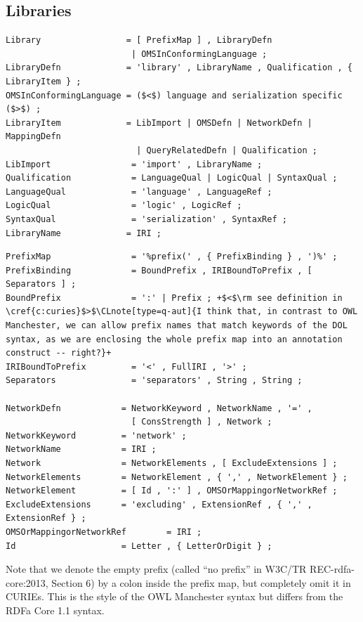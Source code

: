 \documentclass[10pt,fleqn,%
\ifpretendfinal
final%
\else
draft%
\fi,
]{scrreprt}
\makeatletter
\newcommand*\CommentAuthor{}
\renewcommand*\CommentAuthor{#1}}
\newcommand*\CommentDate{}
\renewcommand*\CommentDate{#1}}
\newcommand*\CommentId{}
\renewcommand*\CommentId{#1}}
\newcommand*\CommentType{}
\renewcommand*\CommentType{#1}}
\newcommand*{\SetCommentColorByType}[1]{%
\edef\localType{{#1}}%
\expandafter\ifstrequal\localType{q-aut}{\colorlet{CommentColor}{red}}{%
\expandafter\ifstrequal\localType{q-all}{\colorlet{CommentColor}{orange}}{%
\expandafter\ifstrequal\localType{todo}{\colorlet{CommentColor}{orange}}{%
\expandafter\ifstrequal\localType{fyi}{\colorlet{CommentColor}{lightgray}}{%
\colorlet{CommentColor}{yellow}}}}}}
\newcommand*{\SetCommentPrefixByType}[1]{%
\edef\localType{{#1}}%
\expandafter\@ifmtarg\localType{%
\edef\CommentPrefix{}%
}{%
\caseupper[q]{#1}%
\edef\CommentPrefix{\thestring: }%
}}
\newcommand*{\initComment}[1]{%
\setkeys{Comment}{#1}%
\SetCommentColorByType{\CommentType}%
\relax%
\SetCommentPrefixByType{\CommentType}%
\relax%
}
\newcommand*{\todonote}[2][]{%
\initComment{#1}%
\pdfcomment[author=\CommentAuthor,color=CommentColor,date=\CommentDate,id=\CommentId]{%
\CommentPrefix
#2}}
\renewcommand*{\todonote}[2][]{%
\initComment{#1}%
\ednote{\CommentPrefix #2}}
\newcommand*{\CLnote}[2][author=Christoph Lange]{%
\todonote[author=Christoph Lange,#1]{#2} 
}
\newcommand{\clauserefname}{clause}
\newcommand{\cref}[1]{\clauserefname~\ref{#1}}
\newcommand{\ssclause}[1]{\subsection{#1}}
\newcommand{\nisref}[1]{#1}
\makeatother
\begin{document}
\ssclause{Libraries}

\begin{lstlisting}[language=ebnf,escapeinside={()},morecomment={[l]{\%\%\ }}]
Library                 = [ PrefixMap ] , LibraryDefn
                         | OMSInConformingLanguage ;
LibraryDefn             = 'library' , LibraryName , Qualification , { LibraryItem } ;
OMSInConformingLanguage = ($<$) language and serialization specific ($>$) ;
LibraryItem             = LibImport | OMSDefn | NetworkDefn | MappingDefn 
                          | QueryRelatedDefn | Qualification ;
LibImport                = 'import' , LibraryName ;
Qualification            = LanguageQual | LogicQual | SyntaxQual ;
LanguageQual             = 'language' , LanguageRef ;
LogicQual                = 'logic' , LogicRef ;
SyntaxQual               = 'serialization' , SyntaxRef ;
LibraryName             = IRI ;
\end{lstlisting}

\begin{lstlisting}[language=ebnf,escapechar=+,morecomment={[l]{\%\%\ }}]
PrefixMap                = '%prefix(' , { PrefixBinding } , ')%' ;
PrefixBinding            = BoundPrefix , IRIBoundToPrefix , [ Separators ] ;
BoundPrefix              = ':' | Prefix ; +$<$\rm see definition in \cref{c:curies}$>$\CLnote[type=q-aut]{I think that, in contrast to OWL Manchester, we can allow prefix names that match keywords of the DOL syntax, as we are enclosing the whole prefix map into an annotation construct -- right?}+ 
IRIBoundToPrefix         = '<' , FullIRI , '>' ;
Separators               = 'separators' , String , String ;

NetworkDefn            = NetworkKeyword , NetworkName , '=' , 
                         [ ConsStrength ] , Network ;
NetworkKeyword         = 'network' ;
NetworkName            = IRI ;
Network                = NetworkElements , [ ExcludeExtensions ] ;
NetworkElements        = NetworkElement , { ',' , NetworkElement } ;
NetworkElement         = [ Id , ':' ] , OMSOrMappingorNetworkRef ;
ExcludeExtensions      = 'excluding' , ExtensionRef , { ',' , ExtensionRef } ;
OMSOrMappingorNetworkRef        = IRI ;
Id                     = Letter , { LetterOrDigit } ;
\end{lstlisting}

Note that we denote the empty prefix (called ``no prefix'' in \nisref{W3C/TR REC-rdfa-core:2013, Section 6}) by a colon inside the prefix map, but completely omit it in CURIEs.  This is the style of the OWL Manchester syntax \cite{W3C:NOTE-owl2-manchester-syntax-20091027} but differs from the RDFa Core 1.1 syntax.
\end{document}
